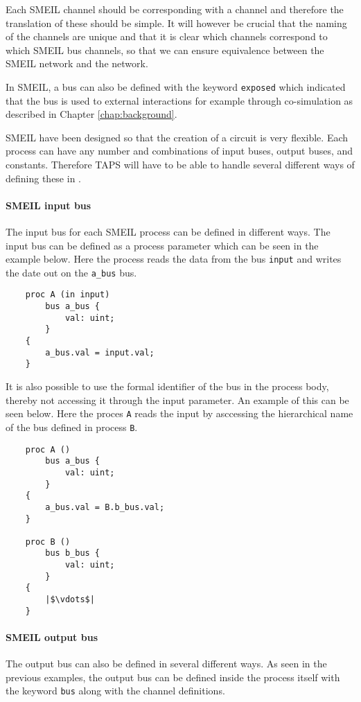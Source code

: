Each SMEIL channel should be corresponding with a \cspm{} channel and therefore the translation of these should be simple. It will however be crucial that the naming of the \cspm{} channels are unique and that it is clear which \cspm{} channels correspond to which SMEIL bus channels, so that we can ensure equivalence between the SMEIL network and the \cspm{} network.

In SMEIL, a bus can also be defined with the keyword \texttt{exposed} which indicated that the bus is used to external interactions for example through co-simulation as described in Chapter \ref{chap:background}.

SMEIL have been designed so that the creation of a circuit is very flexible. Each process can have any number and combinations of input buses, output buses, and constants. Therefore TAPS will have to be able to handle several different ways of defining these in \cspm{}.

\paragraph{SMEIL input bus}
The input bus for each SMEIL process can be defined in different ways. The input bus can be defined as a process parameter which can be seen in the example below. Here the process reads the data from the bus \texttt{input} and writes the date out on the \texttt{a\_bus} bus.
\begin{verbatim}
    proc A (in input)
        bus a_bus {
            val: uint;
        }
    {
        a_bus.val = input.val;
    }
\end{verbatim}
It is also possible to use the formal identifier of the bus in the process body, thereby not accessing it through the input parameter. An example of this can be seen below. Here the proces \texttt{A} reads the input by asccessing the hierarchical name of the bus defined in process \texttt{B}.
\begin{verbatim}
    proc A ()
        bus a_bus {
            val: uint;
        }
    {
        a_bus.val = B.b_bus.val;
    }

    proc B ()
        bus b_bus {
            val: uint;
        }
    {
        |$\vdots$|
    }
\end{verbatim}

\paragraph{SMEIL output bus}
The output bus can also be defined in several different ways.
As seen in the previous examples, the output bus can be defined inside the process itself with the keyword \texttt{bus} along with the channel definitions.

